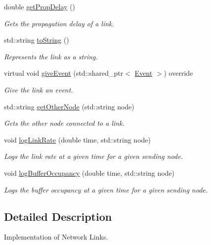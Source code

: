 \begin{DoxyCompactItemize}
\item 
double \hyperlink{classLink_a6349999e40910091ecea77e2a366aa46}{get\-Prop\-Delay} ()
\begin{DoxyCompactList}\small\item\em \-Gets the propagation delay of a link. \end{DoxyCompactList}\item 
std\-::string \hyperlink{classLink_a8c768141c7ebf3b852bf978757f903be}{to\-String} ()
\begin{DoxyCompactList}\small\item\em \-Represents the link as a string. \end{DoxyCompactList}\item 
virtual void \hyperlink{classLink_abd9466c4c2097329f4affd9b2eafbd7a}{give\-Event} (std\-::shared\-\_\-ptr$<$ \hyperlink{classEvent}{\-Event} $>$) override
\begin{DoxyCompactList}\small\item\em \-Give the link an event. \end{DoxyCompactList}\item 
std\-::string \hyperlink{classLink_aaa4e4c72a6384f118846765c296e5634}{get\-Other\-Node} (std\-::string node)
\begin{DoxyCompactList}\small\item\em \-Gets the other node connected to a link. \end{DoxyCompactList}\item 
void \hyperlink{classLink_a0e1ec62377102139e4acc14392e96c12}{log\-Link\-Rate} (double time, std\-::string node)
\begin{DoxyCompactList}\small\item\em \-Logs the link rate at a given time for a given sending node. \end{DoxyCompactList}\item 
void \hyperlink{classLink_af07994bcf90cd63abe9edab218a5d752}{log\-Buffer\-Occupancy} (double time, std\-::string node)
\begin{DoxyCompactList}\small\item\em \-Logs the buffer occupancy at a given time for a given sending node. \end{DoxyCompactList}\end{DoxyCompactItemize}


\subsection{\-Detailed \-Description}
\-Implementation of \-Network \-Links. 

